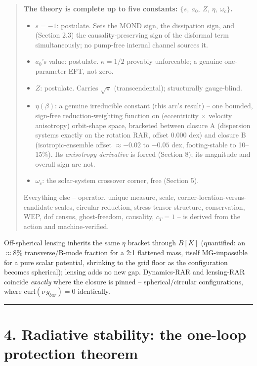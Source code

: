 \documentclass[
]{article}
\providecommand{\tightlist}{%
  \setlength{\itemsep}{0pt}\setlength{\parskip}{0pt}}
\begin{document}
\begin{quote}
\textbf{The theory is complete up to five constants:
\(\{s,\ a_0,\ Z,\ \eta,\ \omega_c\}\).}

\begin{itemize}
\tightlist
\item
  \(s = -1\): postulate. Sets the MOND sign, the dissipation sign, and
  (Section 2.3) the causality-preserving sign of the disformal term
  simultaneously; no pump-free internal channel sources it.
\item
  \(a_0\)'s value: postulate. \(\kappa = 1/2\) provably unforceable; a
  genuine one-parameter EFT, not zero.
\item
  \(Z\): postulate. Carries \(\sqrt\pi\) (transcendental); structurally
  gauge-blind.
\item
  \(\eta(\beta)\): a genuine irreducible constant (this arc's result) --
  one bounded, sign-free reduction-weighting function on (eccentricity
  \(\times\) velocity anisotropy) orbit-shape space, bracketed between
  closure A (dispersion systems exactly on the rotation RAR, offset
  0.000 dex) and closure B (isotropic-ensemble offset \(\approx -0.02\)
  to \(-0.05\) dex, footing-stable to 10--15\%). Its \emph{anisotropy
  derivative} is forced (Section 8); its magnitude and overall sign are
  not.
\item
  \(\omega_c\): the solar-system crossover corner, free (Section 5).
\end{itemize}

Everything else -- operator, unique measure, scale,
corner-location-versus-candidate-scales, circular reduction,
stress-tensor structure, conservation, WEP, dof census, ghost-freedom,
causality, \(c_T = 1\) -- is derived from the action and
machine-verified.
\end{quote}

Off-spherical lensing inherits the same \(\eta\) bracket through
\(B[K]\) (quantified: an \(\approx 8\%\) transverse/B-mode fraction for
a 2:1 flattened mass, itself MG-impossible for a pure scalar potential,
shrinking to the grid floor as the configuration becomes spherical);
lensing adds no new gap. Dynamics-RAR and lensing-RAR coincide
\emph{exactly} where the closure is pinned -- spherical/circular
configurations, where \(\mathrm{curl}(\nu\, g_{bar}) = 0\) identically.

\begin{center}\rule{0.5\linewidth}{0.5pt}\end{center}

\section{4. Radiative stability: the one-loop protection
theorem}\label{radiative-stability-the-one-loop-protection-theorem}
\end{document}
